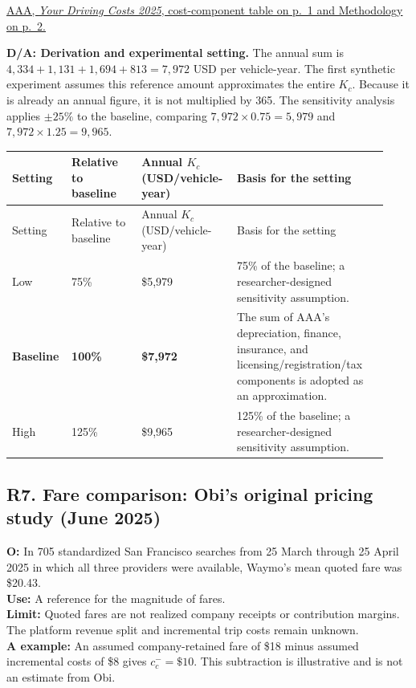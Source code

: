 \documentclass[10pt,a4paper]{article}
\begin{document}
\par\href{https://newsroom.aaa.com/wp-content/uploads/2025/09/UPDATE-AAA-Fact-Sheet-Your-Driving-Cost-9.2025-1.pdf#page=1}{AAA, \textit{Your Driving Costs 2025}, cost-component table on p.~1 and Methodology on p.~2.}

\medskip
\noindent
\textbf{D/A: Derivation and experimental setting.}
The annual sum is $4{,}334+1{,}131+1{,}694+813=7{,}972$ USD per vehicle-year. The first synthetic experiment assumes this reference amount approximates the entire $K_c$. Because it is already an annual figure, it is not multiplied by 365. The sensitivity analysis applies $\pm25\%$ to the baseline, comparing $7{,}972\times0.75=5{,}979$ and $7{,}972\times1.25=9{,}965$.

\begingroup
\small
\setlength{\tabcolsep}{4pt}
\renewcommand{\arraystretch}{1.2}
\begin{longtable}{@{}P{0.12\linewidth}P{0.18\linewidth}P{0.24\linewidth}P{0.39\linewidth}@{}}
\toprule
Setting & Relative to baseline & Annual $K_c$ \newline (USD/vehicle-year) & Basis for the setting \\
\midrule
\endfirsthead
\toprule
Setting & Relative to baseline & Annual $K_c$ \newline (USD/vehicle-year) & Basis for the setting \\
\midrule
\endhead

Low & 75\% & \$5,979 & 75\% of the baseline; a researcher-designed sensitivity assumption. \\
\addlinespace
\textbf{Baseline} & \textbf{100\%} & \textbf{\$7,972} & The sum of AAA's depreciation, finance, insurance, and licensing/registration/tax components is adopted as an approximation. \\
\addlinespace
High & 125\% & \$9,965 & 125\% of the baseline; a researcher-designed sensitivity assumption. \\
\bottomrule
\end{longtable}
\endgroup


\subsection*{\hypertarget{rationale-R7}{R7. Fare comparison: Obi's original pricing study (June 2025)}}

\textbf{O:} In 705 standardized San Francisco searches from 25 March through 25 April 2025 in which all three providers were available, Waymo's mean quoted fare was \$20.43.\\
\textbf{Use:} A reference for the magnitude of fares.\\
\textbf{Limit:} Quoted fares are not realized company receipts or contribution margins. The platform revenue split and incremental trip costs remain unknown. \\
\textbf{A example:} An assumed company-retained fare of \$18 minus assumed incremental costs of \$8 gives $c_c^-=\$10$. This subtraction is illustrative and is not an estimate from Obi.
\end{document}
